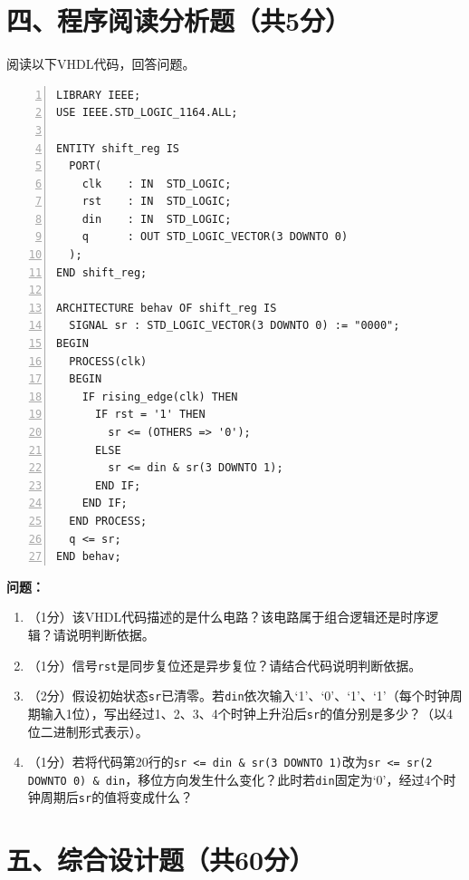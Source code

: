 \newpage

\section*{四、程序阅读分析题（共5分）}

阅读以下VHDL代码，回答问题。

\begin{lstlisting}[caption={分析用VHDL代码——移位寄存器}, language=VDL, numbers=left]
LIBRARY IEEE;
USE IEEE.STD_LOGIC_1164.ALL;

ENTITY shift_reg IS
  PORT(
    clk    : IN  STD_LOGIC;
    rst    : IN  STD_LOGIC;
    din    : IN  STD_LOGIC;
    q      : OUT STD_LOGIC_VECTOR(3 DOWNTO 0)
  );
END shift_reg;

ARCHITECTURE behav OF shift_reg IS
  SIGNAL sr : STD_LOGIC_VECTOR(3 DOWNTO 0) := "0000";
BEGIN
  PROCESS(clk)
  BEGIN
    IF rising_edge(clk) THEN
      IF rst = '1' THEN
        sr <= (OTHERS => '0');
      ELSE
        sr <= din & sr(3 DOWNTO 1);
      END IF;
    END IF;
  END PROCESS;
  q <= sr;
END behav;
\end{lstlisting}

\vspace{0.3cm}

\begin{framed}
\textbf{问题：}
\begin{enumerate}[label=(\arabic*)]
  \item （1分）该VHDL代码描述的是什么电路？该电路属于组合逻辑还是时序逻辑？请说明判断依据。
  \item （1分）信号\texttt{rst}是同步复位还是异步复位？请结合代码说明判断依据。
  \item （2分）假设初始状态\texttt{sr}已清零。若\texttt{din}依次输入`1'、`0'、`1'、`1'（每个时钟周期输入1位），写出经过1、2、3、4个时钟上升沿后\texttt{sr}的值分别是多少？（以4位二进制形式表示）。
  \item （1分）若将代码第20行的\texttt{sr <= din \& sr(3 DOWNTO 1)}改为\texttt{sr <= sr(2 DOWNTO 0) \& din}，移位方向发生什么变化？此时若\texttt{din}固定为`0'，经过4个时钟周期后\texttt{sr}的值将变成什么？
\end{enumerate}
\end{framed}

\newpage

\section*{五、综合设计题（共60分）}

